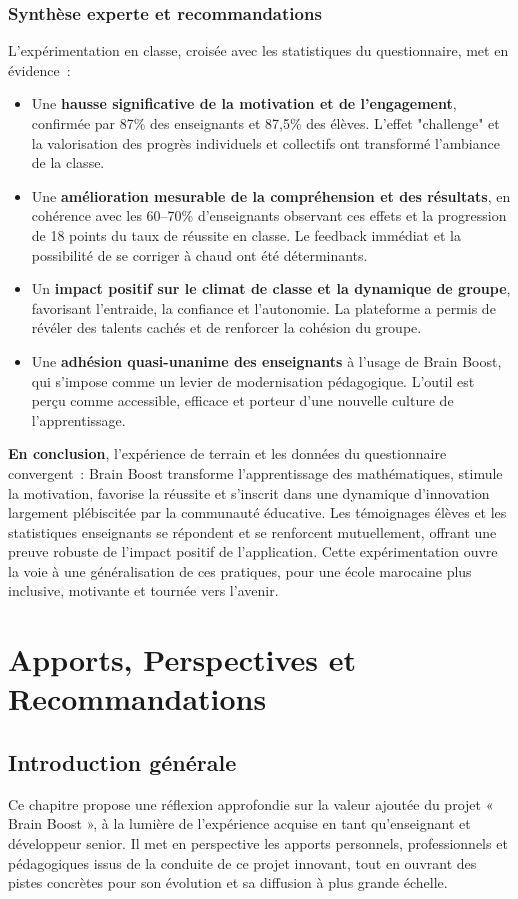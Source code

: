 \documentclass[a4paper,11pt]{report}
\begin{document}
\subsection{Synthèse experte et recommandations}
L'expérimentation en classe, croisée avec les statistiques du questionnaire, met en évidence :
\begin{itemize}
    \item Une \textbf{hausse significative de la motivation et de l'engagement}, confirmée par 87\% des enseignants et 87,5\% des élèves. L'effet "challenge" et la valorisation des progrès individuels et collectifs ont transformé l'ambiance de la classe.
    \item Une \textbf{amélioration mesurable de la compréhension et des résultats}, en cohérence avec les 60--70\% d'enseignants observant ces effets et la progression de 18 points du taux de réussite en classe. Le feedback immédiat et la possibilité de se corriger à chaud ont été déterminants.
    \item Un \textbf{impact positif sur le climat de classe et la dynamique de groupe}, favorisant l'entraide, la confiance et l'autonomie. La plateforme a permis de révéler des talents cachés et de renforcer la cohésion du groupe.
    \item Une \textbf{adhésion quasi-unanime des enseignants} à l'usage de Brain Boost, qui s'impose comme un levier de modernisation pédagogique. L'outil est perçu comme accessible, efficace et porteur d'une nouvelle culture de l'apprentissage.
\end{itemize}

\textbf{En conclusion}, l'expérience de terrain et les données du questionnaire convergent : Brain Boost transforme l'apprentissage des mathématiques, stimule la motivation, favorise la réussite et s'inscrit dans une dynamique d'innovation largement plébiscitée par la communauté éducative. Les témoignages élèves et les statistiques enseignants se répondent et se renforcent mutuellement, offrant une preuve robuste de l'impact positif de l'application. Cette expérimentation ouvre la voie à une généralisation de ces pratiques, pour une école marocaine plus inclusive, motivante et tournée vers l'avenir.

\chapter{Apports, Perspectives et Recommandations}


\section*{Introduction générale}
Ce chapitre propose une réflexion approfondie sur la valeur ajoutée du projet « Brain Boost », à la lumière de l'expérience acquise en tant qu'enseignant et développeur senior. Il met en perspective les apports personnels, professionnels et pédagogiques issus de la conduite de ce projet innovant, tout en ouvrant des pistes concrètes pour son évolution et sa diffusion à plus grande échelle.
\end{document}
